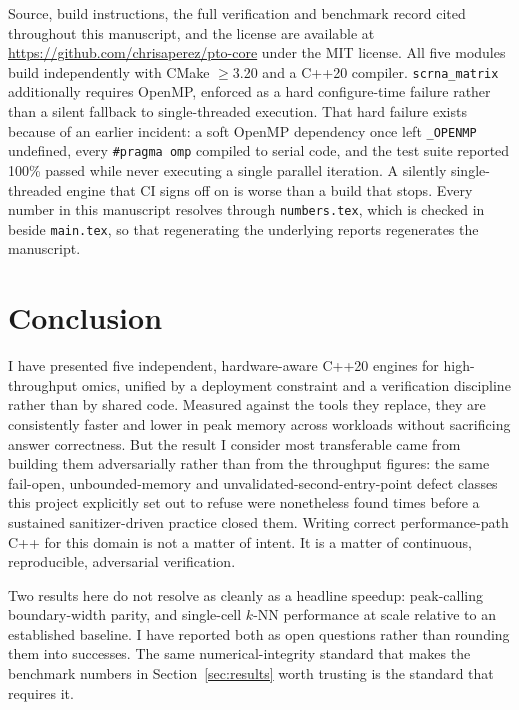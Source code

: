 \documentclass[10pt,twocolumn]{article}
\begin{document}
Source, build instructions, the full verification and benchmark record cited
throughout this manuscript, and the license are available at
\url{https://github.com/chrisaperez/pto-core} under the MIT license. All five
modules build independently with CMake $\geq$3.20 and a C++20 compiler.
\texttt{scrna\_matrix} additionally requires OpenMP, enforced as a hard
configure-time failure rather than a silent fallback to single-threaded
execution. That hard failure exists because of an earlier incident: a soft
OpenMP dependency once left \texttt{\_OPENMP} undefined, every
\texttt{\#pragma omp} compiled to serial code, and the test suite reported
100\% passed while never executing a single parallel iteration. A silently
single-threaded engine that CI signs off on is worse than a build that stops.
Every number in this manuscript resolves through \texttt{numbers.tex}, which
is checked in beside \texttt{main.tex}, so that regenerating the underlying
reports regenerates the manuscript.

\section{Conclusion}

I have presented five independent, hardware-aware C++20 engines for
high-throughput omics, unified by a deployment constraint and a verification
discipline rather than by shared code. Measured against the tools they
replace, they are consistently faster and lower in peak memory across
\NumBenchCases{} workloads without sacrificing answer correctness. But the
result I consider most transferable came from building them adversarially
rather than from the throughput figures: the same fail-open,
unbounded-memory and unvalidated-second-entry-point defect classes this
project explicitly set out to refuse were nonetheless found \NumAuditTotal{}
times before a sustained sanitizer-driven practice closed them. Writing
correct performance-path C++ for this domain is not a matter of intent. It is
a matter of continuous, reproducible, adversarial verification.

Two results here do not resolve as cleanly as a headline speedup:
peak-calling boundary-width parity, and single-cell $k$-NN performance at
scale relative to an established baseline. I have reported both as open
questions rather than rounding them into successes. The same
numerical-integrity standard that makes the benchmark numbers in
Section~\ref{sec:results} worth trusting is the standard that requires it.
\end{document}
